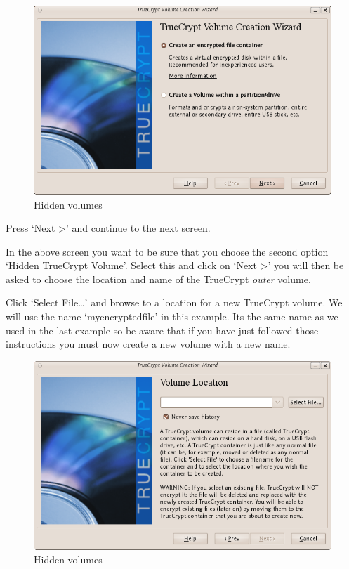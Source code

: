 \begin{figure}[htbp]
\centering
\includegraphics{hidden_vol_002.png}
\caption{Hidden volumes}
\end{figure}

Press `Next \textgreater{}' and continue to the next screen.

In the above screen you want to be sure that you choose the second
option `Hidden TrueCrypt Volume'. Select this and click on `Next
\textgreater{}' you will then be asked to choose the location and name
of the TrueCrypt \emph{outer} volume.

Click `Select File\ldots{}' and browse to a location for a new TrueCrypt
volume. We will use the name `myencryptedfile' in this example. Its the
same name as we used in the last example so be aware that if you have
just followed those instructions you must now create a new volume with a
new name.

\begin{figure}[htbp]
\centering
\includegraphics{hidden_vol_004.png}
\caption{Hidden volumes}
\end{figure}

